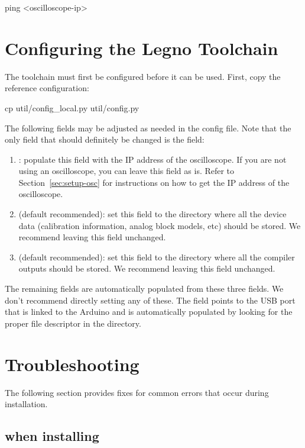 \begin{snippet}
ping <oscilloscope-ip>
\end{snippet}

\section{Configuring the Legno Toolchain}

The \legno toolchain must first be configured before it can be used. First, copy
the reference configuration:

\begin{snippet}
cp util/config_local.py util/config.py
\end{snippet}

The following fields may be adjusted as needed in the config file. Note that the
only field that should definitely be changed is the  field:

\begin{enumerate}
\item {}: populate this field with the IP address of the oscilloscope.
  If you are not using an oscilloscope, you can leave this field as is. Refer
  to Section~\ref{sec:setup-osc} for instructions on how to get the IP address
  of the oscilloscope.
\item{} (default recommended): set this field to the directory where all the device
  data (calibration information, analog block models, etc) should be stored. We
  recommend leaving this field unchanged.
\item{} (default recommended): set this field to the directory where all the compiler
  outputs should be stored. We recommend leaving this field unchanged.
\end{enumerate}

The remaining fields are automatically populated from these three fields. We
don't recommend directly setting any of these. The  field
points to the USB port that is linked to the Arduino and is automatically
populated by looking for the proper file descriptor in the  directory.


\section{Troubleshooting}

The following section provides fixes for common errors that occur during
installation.

\subsection{ when installing }

